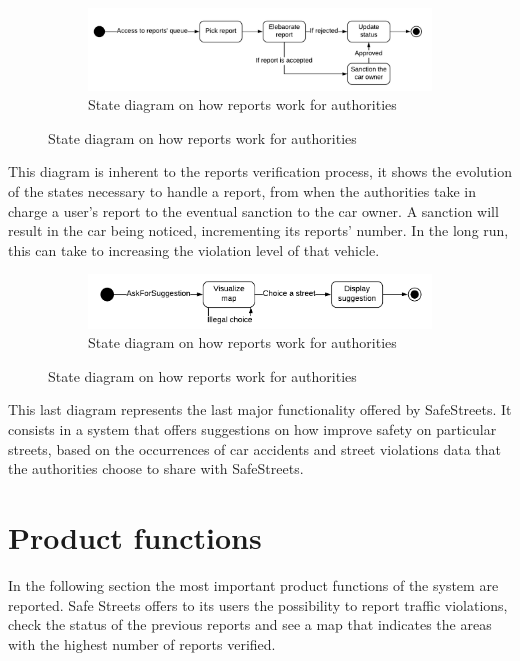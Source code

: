 \documentclass[12pt,a4paper]{report}
\begin{document}
		\begin{figure}[H]
			\begin{subfigure}{\textwidth}
				\includegraphics[scale = 0.75, center]{reportA}
				\caption{State diagram on how reports work for authorities}
			\end{subfigure}
		\end{figure}	
		This diagram is inherent to the reports verification process,
		it shows the evolution of the states necessary to handle a report, from when the authorities take in charge a user's report
		to the eventual sanction to the car owner. A sanction will result in the car being noticed, incrementing its reports' number. In the long run, this can take to increasing the violation level of that vehicle.
		
		\begin{figure}[H]
			\begin{subfigure}{\textwidth}
				\includegraphics[scale = 0.75, center]{suggestion}
				\caption{State diagram on how reports work for authorities}
			\end{subfigure}
		\end{figure}
		This last diagram represents the last major functionality offered by SafeStreets. It consists in a system that offers suggestions
		on how improve safety on particular streets, based on the occurrences of car accidents and street violations data that
		the authorities choose to share with SafeStreets.
		  
		
	\section{Product functions}
		In the following section the most important product functions of the system are reported.
		Safe Streets offers to its users the possibility to report traffic violations, check the status of the previous reports and see 
		a map that indicates the areas with the highest number of reports verified.
\end{document}
